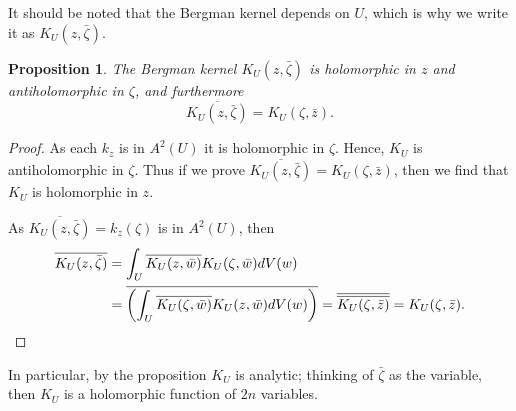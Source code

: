 \documentclass[12pt,openany]{book}
\theoremstyle{plain}
\newtheorem{prop}[thm]{Proposition}
\theoremstyle{remark}
\theoremstyle{definition}
\theoremstyle{exercise}
\theoremstyle{example}
\begin{document}
It should be noted that the Bergman kernel depends on $U$, which is why we write it
as $K_U(z,\bar{\zeta})$.

\begin{prop}
The Bergman kernel $K_U(z,\bar{\zeta})$ is holomorphic in $z$ and
antiholomorphic in $\zeta$, and furthermore
\begin{equation*}
\overline{K_U(z,\bar{\zeta})} = K_U(\zeta,\bar{z}) .
\end{equation*}
\end{prop}

\begin{proof}
As each $k_z$ is in $A^2(U)$ it is holomorphic in $\zeta$.  Hence, $K_U$ is
antiholomorphic in $\zeta$.  Thus if we prove
$\overline{K_U(z,\bar{\zeta})} = K_U(\zeta,\bar{z})$, then we find that $K_U$
is holomorphic in $z$.

As $\overline{K_U(z,\bar{\zeta})} = k_z(\zeta)$ is in $A^2(U)$, then
\begin{equation*}
\begin{split}
\overline{K_U(z,\bar{\zeta})}
& =
\int_{U} \overline{K_U(z,\bar{w})} K_U(\zeta,\bar{w}) dV(w)
\\
& =
\overline{
\left(
\int_{U} \overline{K_U(\zeta,\bar{w})} K_U(z,\bar{w}) dV(w)
\right)
}
=
\overline{
\overline{
K_U(\zeta,\bar{z})
}}
=
K_U(\zeta,\bar{z}) . \qedhere
\end{split}
\end{equation*}
\end{proof}

In particular, by the proposition $K_U$ is analytic; thinking of
$\bar{\zeta}$ as the variable, then $K_U$ is a holomorphic function of
$2n$ variables.
\end{document}
